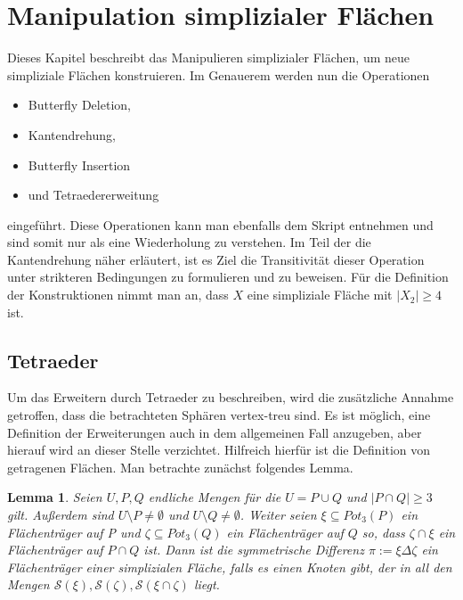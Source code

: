 \documentclass[12pt,titlepage,twoside,cleardoublepage]{article}
\theoremstyle{nummermitklammern}
\newtheorem{lemma}[temp]{Lemma}
\newtheorem{lemma}[zahl]{Lemma}
\numberwithin{equation}{section}
\begin{document}
\section{Manipulation simplizialer Flächen}
Dieses Kapitel beschreibt das Manipulieren simplizialer Flächen, um neue simpliziale Flächen konstruieren. Im Genauerem werden nun die Operationen
\begin{itemize}
\item Butterfly Deletion,
\item Kantendrehung,
 \item Butterfly Insertion
 \item und Tetraedererweitung
\end{itemize} 
 eingeführt.
Diese Operationen kann man ebenfalls dem Skript entnehmen und sind somit nur als eine Wiederholung zu verstehen. Im Teil der die Kantendrehung näher erläutert, ist es Ziel die Transitivität dieser Operation unter strikteren Bedingungen zu formulieren und zu beweisen.
Für die Definition der Konstruktionen nimmt man an, dass $X$ eine simpliziale Fläche mit $\vert X_2 \vert \geq 4$ ist.

  \subsection{Tetraeder}
 Um das Erweitern durch Tetraeder zu beschreiben, wird die zusätzliche Annahme getroffen, dass die betrachteten Sphären vertex-treu sind. Es ist möglich, eine Definition der Erweiterungen auch in dem allgemeinen Fall anzugeben, aber hierauf wird an dieser Stelle verzichtet.
 Hilfreich hierfür ist die Definition von getragenen Flächen. Man betrachte zunächst folgendes Lemma.
\begin{lemma}
Seien $U,P,Q$ endliche Mengen für die $U=P\cup Q$ und $\vert P\cap Q \vert \geq 3$ gilt. Außerdem sind $U\setminus P\neq \emptyset$ und $U\setminus Q \neq \emptyset$. Weiter seien $\xi \subseteq Pot_3(P)$ ein Flächenträger auf P und $\zeta \subseteq Pot_3(Q)$ ein Flächenträger auf $Q$ so, dass $\zeta \cap \xi$ ein Flächenträger auf $P \cap Q$ ist. Dann ist die symmetrische Differenz $\pi :=\xi \Delta \zeta$ ein Flächenträger einer simplizialen Fläche, falls es einen Knoten gibt, der in all den Mengen $\mathcal{S}(\xi),\mathcal{S}(\zeta),\mathcal{S}(\xi\cap\zeta)$ liegt. 
\end{lemma}
\end{document}
